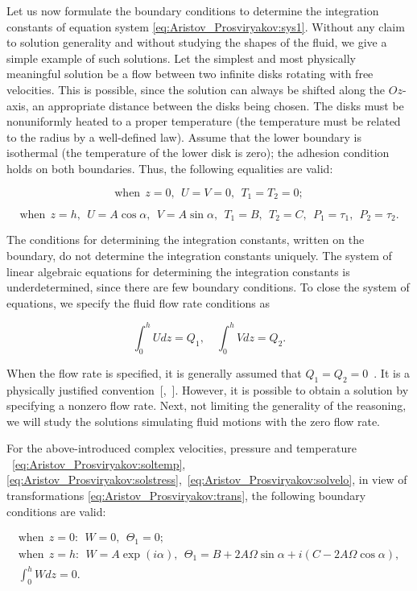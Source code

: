 Let us now formulate the boundary conditions to determine the integration constants of equation system \eqref{eq:Aristov_Prosviryakov:sys1}. Without any claim to solution generality and without studying the shapes of the fluid, we give a simple example of such solutions. Let the simplest and most physically meaningful solution be a flow between two infinite disks rotating with free velocities. This is possible, since the solution can always be shifted along the $Oz$-axis, an appropriate distance between the disks being chosen. The disks must be nonuniformly heated to a proper temperature (the temperature must be related to the radius by a well-defined law). Assume that the lower boundary is isothermal (the temperature of the lower disk is zero); the adhesion condition holds on both boundaries. Thus, the following equalities are valid:

$$\text{when} \ \ z=0, \ \ U=V=0, \ \ T_1=T_2=0;$$

$$\text{when} \ \ z=h, \ \ U=A\cos\alpha, \ \ V=A\sin\alpha, \ \ T_1=B, \ \ T_2=C, \ \ P_1=\tau_1, \ \ P_2=\tau_2.$$



The conditions for determining the integration constants, written on the boundary, do not determine the integration constants uniquely. The system of linear algebraic equations for determining the integration constants is underdetermined, since there are few boundary conditions. To close the system of equations, we specify the fluid flow rate conditions as

$$\int _{0}^{h}Udz =Q_1,\quad  \int_{0}^{h}Vdz =Q_2.$$



When the flow rate is specified, it is generally assumed that  $Q_1=Q_2=0$~\cite{ulg:bib:Aristov2}. It is a physically justified convention~[,~]. However, it is possible to obtain a solution by specifying a nonzero flow rate. Next, not limiting the generality of the reasoning, we will study the solutions simulating fluid motions with the zero flow rate. 



For the above-introduced complex velocities, pressure and temperature ~\eqref{eq:Aristov_Prosviryakov:soltemp}, \eqref{eq:Aristov_Prosviryakov:solstress},~\eqref{eq:Aristov_Prosviryakov:solvelo}, in view of transformations \eqref{eq:Aristov_Prosviryakov:trans}, the following boundary conditions are valid:

\begin{gather}

\label{eq:Aristov_Prosviryakov:bond}

\text{when} \ \ z=0: \ \ W=0, \ \ \Theta_1=0;

\\

\text{when} \ \ z=h: \ \ W=A\exp\left(i\alpha\right), \ \ \Theta_1=B+2A\Omega\sin\alpha+i\left(C-2A\Omega\cos\alpha\right),

\\

\int_{0}^{h}Wdz =0.

\end{gather}



